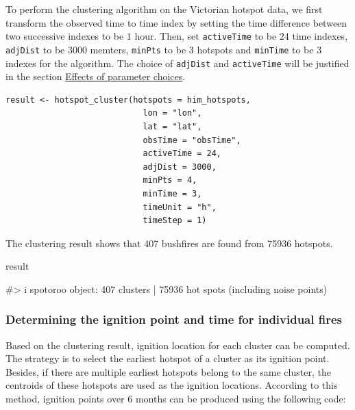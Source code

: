 To perform the clustering algorithm on the Victorian hotspot data, we
first transform the observed time to time index by setting the time
difference between two successive indexes to be \(1\) hour. Then, set
\texttt{activeTime} to be \(24\) time indexes, \texttt{adjDist} to be
\(3000\) memters, \texttt{minPts} to be \(3\) hotspots and
\texttt{minTime} to be \(3\) indexes for the algorithm. The choice of
\texttt{adjDist} and \texttt{activeTime} will be justified in the
section \protect\hyperlink{effects-of-parameter-choices}{Effects of
parameter choices}.

\begin{verbatim}
result <- hotspot_cluster(hotspots = him_hotspots,
                            lon = "lon",
                            lat = "lat",
                            obsTime = "obsTime",
                            activeTime = 24,
                            adjDist = 3000,
                            minPts = 4,
                            minTime = 3,
                            timeUnit = "h",
                            timeStep = 1)
\end{verbatim}

The clustering result shows that 407 bushfires are found from 75936
hotspots.

\begin{Schunk}
\begin{Sinput}
result
\end{Sinput}
\begin{Soutput}
#> i spotoroo object: 407 clusters | 75936 hot spots (including noise points)
\end{Soutput}
\end{Schunk}

\hypertarget{determining-the-ignition-point-and-time-for-individual-fires}{%
\subsubsection{Determining the ignition point and time for individual
fires}\label{determining-the-ignition-point-and-time-for-individual-fires}}

Based on the clustering result, ignition location for each cluster can
be computed. The strategy is to select the earliest hotspot of a cluster
as its ignition point. Besides, if there are multiple earliest hotspots
belong to the same cluster, the centroids of these hotspots are used as
the ignition locations. According to this method, ignition points over 6
months can be produced using the following code:

